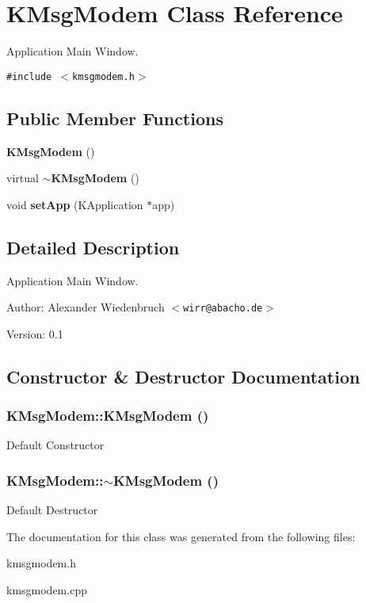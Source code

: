 \section{KMsg\-Modem Class Reference}
\label{classKMsgModem}
Application Main Window.  


{\tt \#include $<$kmsgmodem.h$>$}

\subsection*{Public Member Functions}
\begin{CompactItemize}
\item 
{\bf KMsg\-Modem} ()
\item 
virtual {\bf $\sim$KMsg\-Modem} ()
\item 
void {\bf set\-App} (KApplication $\ast$app)\label{classKMsgModem_a2}

\end{CompactItemize}


\subsection{Detailed Description}
Application Main Window. 

\begin{Desc}
\item[Author:]Alexander Wiedenbruch $<${\tt wirr@abacho.de}$>$ \end{Desc}
\begin{Desc}
\item[Version:]0.1 \end{Desc}




\subsection{Constructor \& Destructor Documentation}
\subsubsection{\setlength{\rightskip}{0pt plus 5cm}KMsg\-Modem::KMsg\-Modem ()}\label{classKMsgModem_a0}


Default Constructor 
\subsubsection{\setlength{\rightskip}{0pt plus 5cm}KMsg\-Modem::$\sim${\bf KMsg\-Modem} ()\hspace{0.3cm}{\tt  [virtual]}}\label{classKMsgModem_a1}


Default Destructor 

The documentation for this class was generated from the following files:\begin{CompactItemize}
\item 
kmsgmodem.h\item 
kmsgmodem.cpp\end{CompactItemize}
